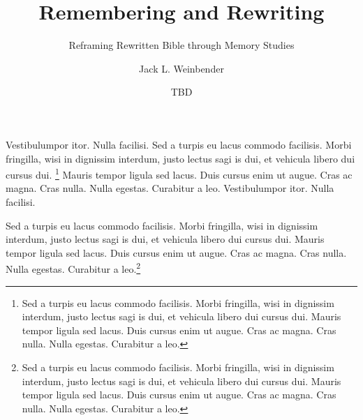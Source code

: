 \documentclass[letterpaper,12pt,oneside]{utexas-dissertation}
\begin{document}
\frontmatter

\author{Jack L. Weinbender}
\title{Remembering and Rewriting}
\subtitle{Reframing Rewritten Bible through Memory Studies}
\date{TBD}

\maketitle

\makecopyright
\makesignatures

\begin{abstract}
\lipsum[5]
\end{abstract}
\restoregeometry

\mainmatter

Vestibulumpor itor. Nulla facilisi. Sed a turpis eu lacus commodo facilisis. Morbi fringilla, wisi in dignissim interdum, justo lectus sagi is dui, et vehicula libero dui cursus dui. \footnote{Sed a turpis eu lacus commodo facilisis. Morbi fringilla, wisi in dignissim interdum, justo lectus sagi is dui, et vehicula libero dui cursus dui. Mauris tempor ligula sed lacus. Duis cursus enim ut augue. Cras ac magna. Cras nulla. Nulla egestas. Curabitur a leo.} Mauris tempor ligula sed lacus. Duis cursus enim ut augue. Cras ac magna. Cras nulla. Nulla egestas. Curabitur a leo.  
Vestibulumpor itor. Nulla facilisi. 

Sed a turpis eu lacus commodo facilisis. Morbi fringilla, wisi in dignissim interdum, justo lectus sagi is dui, et vehicula libero dui cursus dui. Mauris tempor ligula sed lacus. Duis cursus enim ut augue. Cras ac magna. Cras nulla. Nulla egestas. Curabitur a leo.\footnote{Sed a turpis eu lacus commodo facilisis. Morbi fringilla, wisi in dignissim interdum, justo lectus sagi is dui, et vehicula libero dui cursus dui. Mauris tempor ligula sed lacus. Duis cursus enim ut augue. Cras ac magna. Cras nulla. Nulla egestas. Curabitur a leo.}
\end{document}
